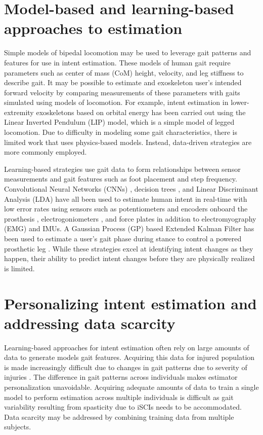 \section{Model-based and learning-based approaches to estimation}

Simple models of bipedal locomotion may be used to leverage gait patterns and features for use in intent estimation. These models of human gait require parameters such as center of mass (CoM) height, velocity, and leg stiffness to describe gait. It may be possible to estimate and exoskeleton user's intended forward velocity by comparing measurements of these parameters with gaits simulated using models of locomotion. For example, intent estimation in lower-extremity exoskeletons based on orbital energy \cite{chen2018dynamic} has been carried out using the Linear Inverted Pendulum (LIP) model, which is a simple model of legged locomotion.  Due to difficulty in modeling some gait characteristics, there is limited work that uses physics-based models. Instead, data-driven strategies \cite{ge2011neural, kalinowska2019data, joukov2017rhythmic} are more commonly employed.

Learning-based strategies use gait data to form relationships between sensor measurements and gait features such as foot placement and step frequency. Convolutional Neural Networks (CNNs) \cite{lee2020image}, decision trees \cite{moolchandani2021design}, and Linear Discriminant Analysis (LDA) \cite{young2013classifying}  have all been used to estimate human intent in real-time with low error rates using sensors such as potentiometers and encoders onboard the prosthesis \cite{young2013classifying}, electrogoniometers \cite{lee2020image}, and force plates \cite{moolchandani2021design} in addition to  electromyography (EMG) and IMUs. A Gaussian Process (GP) based Extended Kalman Filter has been used to estimate a user's gait phase during stance to control a powered prosthetic leg \cite{thatte2019robust}. While these strategies excel at identifying intent changes as they happen, their ability to predict intent changes before they are physically realized is limited.

\section{Personalizing intent estimation and addressing data scarcity}

Learning-based approaches for intent estimation often rely on large amounts of data to generate models gait features. Acquiring this data for injured population is made increasingly difficult due to changes in gait patterns due to severity of injuries \cite{sohn2018variability}. The difference in gait patterns across individuals makes estimator personalization unavoidable. Acquiring adequate amounts of data to train a single model to perform estimation across multiple individuals is difficult as gait variability resulting from spasticity due to iSCIs \cite{krawetz1996gait} needs to be accommodated. Data scarcity may be addressed by combining training data from multiple subjects.


